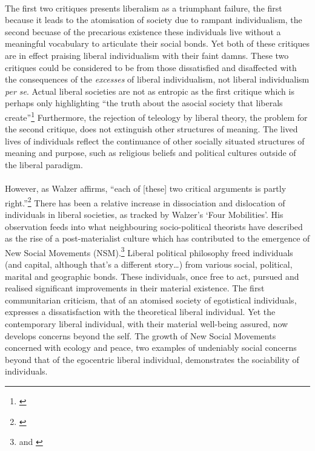 \documentclass[12pt,a4paper,titlepage]{article}
\begin{document}
\paragraph{}The first two critiques presents liberalism as a triumphant failure, the first because it leads to the atomisation of society due to rampant individualism, the second becuase of the precarious existence these individuals live without a meaningful vocabulary to articulate their social bonds. Yet both of these critiques are in effect praising liberal individualism with their faint damns. These two critiques could be considered to be from those dissatisfied and disaffected with the consequences of the \textit{excesses} of liberal individualism, not liberal individualism \textit{per se}. Actual liberal societies are not as entropic as the first critique which is perhaps only highlighting ``the truth about the asocial society that liberals create''\footnote{\cite[p. 7]{walzer:1990cc}} Furthermore, the rejection of teleology by liberal theory, the problem for the second critique, does not extinguish other structures of meaning. The lived lives of individuals reflect the continuance of other socially situated structures of meaning and purpose, such as religious beliefs and political cultures outside of the liberal paradigm.

\paragraph{}However, as Walzer affirms, ``each of [these] two critical arguments is partly right.''\footnote{\cite[p. 11]{walzer:1990cc}} There has been a relative increase in dissociation and dislocation of individuals in liberal societies, as tracked by Walzer's `Four Mobilities'. His observation feeds into what neighbouring socio-political theorists have described as the rise of a post-materialist culture which has contributed to the emergence of New Social Movements (NSM).\footnote{\cite{Eder:1993fj} and \cite{Dalton:1990zr}} Liberal political philosophy freed individuals (and capital, although that's a different story\ldots) from various social, political, marital and geographic bonds. These individuals, once free to act, pursued and realised significant improvements in their material existence. The first communitarian criticism, that of an atomised society of egotistical individuals, expresses a dissatisfaction with the theoretical liberal individual. Yet the contemporary liberal individual, with their material well-being assured, now develops concerns beyond the self. The growth of New Social Movements concerned with ecology and peace, two examples of undeniably social concerns beyond that of the egocentric liberal individual, demonstrates the sociability of individuals.
\end{document}
